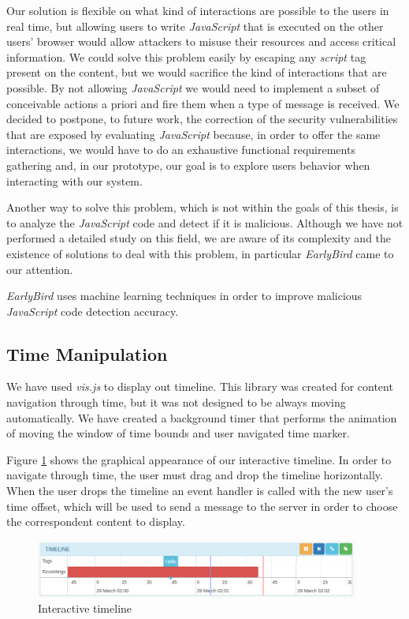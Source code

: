 	Our solution is flexible on what kind of interactions are possible to the users in real time, but allowing users to write \emph{JavaScript} that is executed on the other users' browser would allow attackers to misuse their resources and access critical information. We could solve this problem easily by escaping any \emph{script} tag present on the content, but we would sacrifice the kind of interactions that are possible. By not allowing \emph{JavaScript} we would need to implement a subset of conceivable actions a priori and fire them when a type of message is received. We decided to postpone, to future work, the correction of the security vulnerabilities that are exposed by evaluating \emph{JavaScript} because, in order to offer the same interactions, we would have to do an exhaustive functional requirements gathering and, in our prototype, our goal is to explore users behavior when interacting with our system. 

	Another way to solve this problem, which is not within the goals of this thesis, is to analyze the \emph{JavaScript} code and detect if it is malicious. Although we have not performed a detailed study on this field, we are aware of its complexity and the existence of solutions to deal with this problem, in particular \emph{EarlyBird}\cite{earlybird} came to our attention. 

\emph{EarlyBird} uses machine learning techniques in order to improve malicious \emph{JavaScript} code detection accuracy.


	\subsection{Time Manipulation}

	We have used \emph{vis.js} to display out timeline. This library was created for content navigation through time, but it was not designed to be always moving automatically. We have created a background timer that performs the animation of moving the window of time bounds and user navigated time marker.

	Figure \ref{fig:timeline} shows the graphical appearance of our interactive timeline. In order to navigate through time, the user must drag and drop the timeline horizontally. When the user drops the timeline an event handler is called with the new user's time offset, which will be used to send a message to the server in order to choose the correspondent content to display. 

	\begin{figure}
		\centering
		\includegraphics[width=0.95\textwidth]{figures/timeline.png}
		\caption{Interactive timeline}
		\label{fig:timeline}
	\end{figure}

